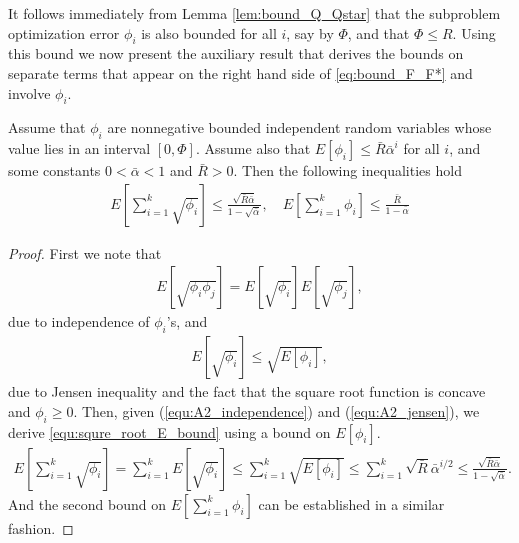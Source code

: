 \documentclass[11pt]{article}
\numberwithin{equation}{section}
\begin{document}
It follows immediately from Lemma \ref{lem:bound_Q_Qstar} that the subproblem optimization error $\phi_i$ is also  bounded for all $i$, say by $\Phi$, and that $\Phi \leq R$. 
Using this bound we now present the auxiliary result that derives the bounds on separate terms that appear on the right hand side of \eqref{eq:bound_F_F*} and involve $\phi_i$. 

\begin{lemma}\label{lem:E_bound}
Assume that $\phi_i$ are nonnegative bounded independent random variables whose value lies in an interval $[0, \Phi]$. Assume also that $E[\phi_i] \leq \bar R \bar \alpha^i$ for all $i$, and some constants  $0 < \bar \alpha < 1$ and $\bar R > 0$.  Then the following inequalities hold 
\begin{align}
    \label{equ:squre_root_E_bound}
    E[\sum_{i=1}^{k} \sqrt{\phi_i}] \leq \frac{ \sqrt{\bar{R} \bar\alpha}}{ 1 - \sqrt{\bar\alpha}}, \quad
    E[\sum_{i=1}^{k} \phi_i] \leq \frac{ \bar{R}}{ 1 - \bar\alpha}
\end{align} 
\end{lemma}
\begin{proof}
    First we note that 
    \begin{align}
        \label{equ:A2_independence}
        E[\sqrt{\phi_i \phi_j}] = E[\sqrt{\phi_i}] E[\sqrt{\phi_j}],
    \end{align}
    due to independence of $\phi_i$'s, and
    \begin{align}
        \label{equ:A2_jensen}
        E[\sqrt{\phi_i}] \leq \sqrt{E[\phi_i]},
    \end{align}
    due to Jensen inequality and the fact that the square root function is concave and $\phi_i\geq 0$. Then, given (\ref{equ:A2_independence}) and (\ref{equ:A2_jensen}), we  derive \eqref{equ:squre_root_E_bound}  using a bound on $E[\phi_i]$.
    \begin{align*}
        E[\sum_{i=1}^{k} \sqrt{\phi_i}]
        = \sum_{i=1}^k E[\sqrt{\phi_i}] \leq \sum_{i=1}^k \sqrt{E[\phi_i]} \leq \sum_{i=1}^k \sqrt{\bar{R}}\bar\alpha^{i/2} \leq \frac{\sqrt{\bar{R}\bar\alpha}}{1 - \sqrt{\bar\alpha}}.
    \end{align*}
    And the second bound on $E[\sum_{i=1}^{k} \phi_i]$ can be established in a similar fashion.
\end{proof}
\end{document}
